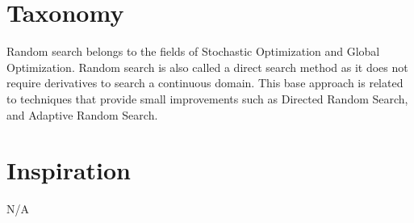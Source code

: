 \documentclass[a4paper, 11pt]{article}
\begin{document}
\section{Taxonomy}
\label{sec:taxonomy}
Random search belongs to the fields of Stochastic Optimization and Global Optimization.
Random search is also called a direct search method as it does not require derivatives to search a continuous domain.
This base approach is related to techniques that provide small improvements such as Directed Random Search, and Adaptive Random Search. 

\section{Inspiration}
\label{sec:inspiration}
N/A

\end{document}
